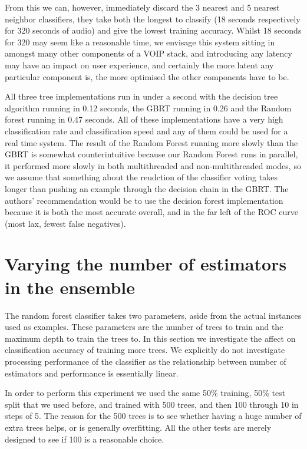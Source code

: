 \documentclass[ %
                    author={Sam Phippen},
                supervisor={Dr. Rafal Bogacz},
                     title={Real time voice activity detectors in noisy personal computing environments},
                  subtitle={},
                    degree={MEng},
                      year={2012} ]{thesis}
\begin{document}
From this we can, however, immediately discard the 3 nearest and 5 nearest
neighbor classifiers, they take both the longest to classify (18 seconds
respectively for 320 seconds of audio) and give the lowest training accuracy.
Whilst 18 seconds for 320 may seem like a reasonable time, we envisage this
system sitting in amongst many other components of a VOIP stack, and
introducing any latency may have an impact on user experience, and certainly
the more latent any particular component is, the more optimised the other
components have to be.

All three tree implementations run in under a second with the decision tree
algorithm running in 0.12 seconds, the GBRT running in 0.26 and the Random
forest running in 0.47 seconds. All of these implementations have a very high
classification rate and classification speed and any of them could be used for
a real time system. The result of the Random  Forest running more slowly than
the GBRT is somewhat counterintuitive because our Random Forest runs in
parallel, it performed more slowly in both multithreaded and non-multithreaded
modes, so we assume that something about the reudction of the classifier voting
takes longer than pushing an example through the decision chain in the GBRT.
The authors' recommendation would be to use the decision forest implementation
because it is both the most accurate overall, and in the far left of the ROC
curve (most lax, fewest false negatives).

\section{Varying the number of estimators in the ensemble}

The random forest classifier takes two parameters, aside from the actual
instances used as examples. These parameters are the number of trees to train
and the maximum depth to train the trees to. In this section we investigate the
affect on classification accuracy of training more trees. We explicitly do not
investigate processing performance of the classifier as the relationship between
number of estimators and performance is essentially linear.

In order to perform this experiment we used the same 50\% training, 50\% test
split that we used before, and trained with 500 trees, and then 100 through 10
in steps of 5. The reason for the 500 trees is to see whether having a huge number
of extra trees helps, or is generally overfitting. All the other tests are merely
designed to see if 100 is a reasonable choice.
\end{document}
